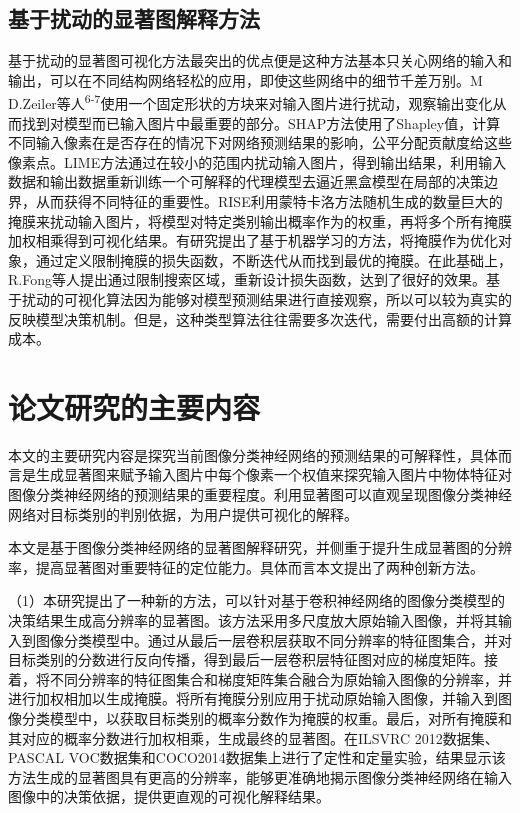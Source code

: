 \subsection{基于扰动的显著图解释方法}
基于扰动的显著图可视化方法最突出的优点便是这种方法基本只关心网络的输入和输出，可以在不同结构网络轻松的应用，即使这些网络中的细节千差万别。M D.Zeiler等人\textsuperscript{\cite{zeiler2014visualizing}6-7}使用一个固定形状的方块来对输入图片进行扰动，观察输出变化从而找到对模型而已输入图片中最重要的部分。SHAP方法\textsuperscript{\cite{lundberg2017unified}}使用了Shapley值，计算不同输入像素在是否存在的情况下对网络预测结果的影响，公平分配贡献度给这些像素点。LIME\textsuperscript{\cite{ribeiro2016should}}方法通过在较小的范围内扰动输入图片，得到输出结果，利用输入数据和输出数据重新训练一个可解释的代理模型去逼近黑盒模型在局部的决策边界，从而获得不同特征的重要性。RISE\textsuperscript{\cite{petsiuk2018rise}}利用蒙特卡洛方法随机生成的数量巨大的掩膜来扰动输入图片，将模型对特定类别输出概率作为的权重，再将多个所有掩膜加权相乘得到可视化结果。有研究提出了基于机器学习的方法，将掩膜作为优化对象，通过定义限制掩膜的损失函数，不断迭代从而找到最优的掩膜。在此基础上，R.Fong等人\textsuperscript{\cite{fong2019understanding,fong2017interpretable}}提出通过限制搜索区域，重新设计损失函数，达到了很好的效果。基于扰动的可视化算法因为能够对模型预测结果进行直接观察，所以可以较为真实的反映模型决策机制。但是，这种类型算法往往需要多次迭代，需要付出高额的计算成本。

\section{论文研究的主要内容}
本文的主要研究内容是探究当前图像分类神经网络的预测结果的可解释性，具体而言是生成显著图来赋予输入图片中每个像素一个权值来探究输入图片中物体特征对图像分类神经网络的预测结果的重要程度。利用显著图可以直观呈现图像分类神经网络对目标类别的判别依据，为用户提供可视化的解释。  

本文是基于图像分类神经网络的显著图解释研究，并侧重于提升生成显著图的分辨率，提高显著图对重要特征的定位能力。具体而言本文提出了两种创新方法。

（1）本研究提出了一种新的方法，可以针对基于卷积神经网络的图像分类模型的决策结果生成高分辨率的显著图。该方法采用多尺度放大原始输入图像，并将其输入到图像分类模型中。通过从最后一层卷积层获取不同分辨率的特征图集合，并对目标类别的分数进行反向传播，得到最后一层卷积层特征图对应的梯度矩阵。接着，将不同分辨率的特征图集合和梯度矩阵集合融合为原始输入图像的分辨率，并进行加权相加以生成掩膜。将所有掩膜分别应用于扰动原始输入图像，并输入到图像分类模型中，以获取目标类别的概率分数作为掩膜的权重。最后，对所有掩膜和其对应的概率分数进行加权相乘，生成最终的显著图。在ILSVRC 2012数据集\textsuperscript{\cite{ILSVRC}}、PASCAL VOC数据集\textsuperscript{\cite{pascal}}和COCO2014数据集\textsuperscript{\cite{coco}}上进行了定性和定量实验，结果显示该方法生成的显著图具有更高的分辨率，能够更准确地揭示图像分类神经网络在输入图像中的决策依据，提供更直观的可视化解释结果。

